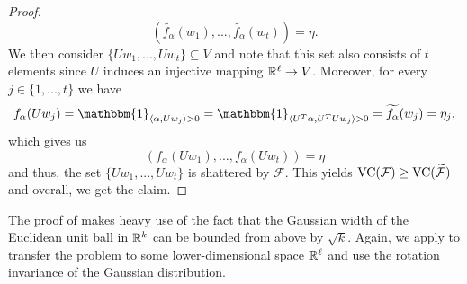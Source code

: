 \begin{proof}
\begin{equation*}
(\widetilde{f_\alpha}(w_1), ...,\widetilde{f_\alpha}(w_t)) = \eta.
\end{equation*}
We then consider $\{Uw_1, ..., U w_t\} \subseteq V$ and note that this set also consists of $t$ elements since $U$ induces an injective mapping $\mathbb{R}^\ell \to V$. Moreover, for every $j \in \{1,...,t\}$ we have
\begin{equation*}
f_\alpha(Uw_j) = \mathbbm{1}_{\langle \alpha, Uw_j \rangle >0} = \mathbbm{1}_{\langle U^T \alpha, U^T U w_j \rangle > 0} = \widetilde{f_\alpha}(w_j) = \eta_j,
\end{equation*}
which gives us
\begin{equation*}
(f_\alpha(Uw_1),..., f_\alpha(Uw_t)) = \eta
\end{equation*}
and thus, the set $\{Uw_1,..., Uw_t\}$ is shattered by $\mathcal{F}$.
This yields $\operatorname{VC} (\mathcal{F}) \geq \operatorname{VC}(\widetilde{\mathcal{F}})$ and overall, we get the claim.
\end{proof}
The proof of  makes heavy use of the fact that the Gaussian width of the Euclidean unit ball in $\mathbb{R}^k$ can be bounded from above by $\sqrt{k}$. Again, we apply  to transfer the problem to some lower-dimensional space $\mathbb{R}^\ell$ and use the rotation invariance of the Gaussian distribution.
\renewcommand*{\proofname}{Proof of \Cref{prop:gauss_width}}
